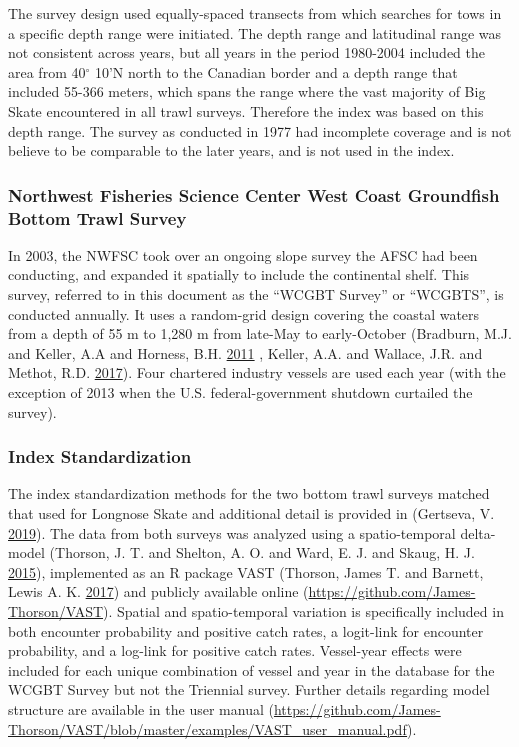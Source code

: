 \documentclass[12pt,]{article}
\begin{document}
The survey design used equally-spaced transects from which searches for
tows in a specific depth range were initiated. The depth range and
latitudinal range was not consistent across years, but all years in the
period 1980-2004 included the area from 40\(^\circ\) 10'N north to the
Canadian border and a depth range that included 55-366 meters, which
spans the range where the vast majority of Big Skate encountered in all
trawl surveys. Therefore the index was based on this depth range. The
survey as conducted in 1977 had incomplete coverage and is not believe
to be comparable to the later years, and is not used in the index.

\hypertarget{northwest-fisheries-science-center-west-coast-groundfish-bottom-trawl-survey}{%
\subsubsection{Northwest Fisheries Science Center West Coast Groundfish
Bottom Trawl
Survey}\label{northwest-fisheries-science-center-west-coast-groundfish-bottom-trawl-survey}}

In 2003, the NWFSC took over an ongoing slope survey the AFSC had been
conducting, and expanded it spatially to include the continental shelf.
This survey, referred to in this document as the ``WCGBT Survey'' or
``WCGBTS'', is conducted annually. It uses a random-grid design covering
the coastal waters from a depth of 55 m to 1,280 m from late-May to
early-October (Bradburn, M.J. and Keller, A.A and Horness, B.H.
\protect\hyperlink{ref-Bradburn2011}{2011} , Keller, A.A. and Wallace,
J.R. and Methot, R.D. \protect\hyperlink{ref-Keller2017}{2017}). Four
chartered industry vessels are used each year (with the exception of
2013 when the U.S. federal-government shutdown curtailed the survey).

\hypertarget{index-standardization}{%
\subsubsection{Index Standardization}\label{index-standardization}}

The index standardization methods for the two bottom trawl surveys
matched that used for Longnose Skate and additional detail is provided
in (Gertseva, V. \protect\hyperlink{ref-Gertseva2019}{2019}). The data
from both surveys was analyzed using a spatio-temporal delta-model
(Thorson, J. T. and Shelton, A. O. and Ward, E. J. and Skaug, H. J.
\protect\hyperlink{ref-Thorson2015}{2015}), implemented as an R package
VAST (Thorson, James T. and Barnett, Lewis A. K.
\protect\hyperlink{ref-Thorson2017a}{2017}) and publicly available
online (\url{https://github.com/James-Thorson/VAST}). Spatial and
spatio-temporal variation is specifically included in both encounter
probability and positive catch rates, a logit-link for encounter
probability, and a log-link for positive catch rates. Vessel-year
effects were included for each unique combination of vessel and year in
the database for the WCGBT Survey but not the Triennial survey. Further
details regarding model structure are available in the user manual
(\url{https://github.com/James-Thorson/VAST/blob/master/examples/VAST_user_manual.pdf}).
\end{document}
